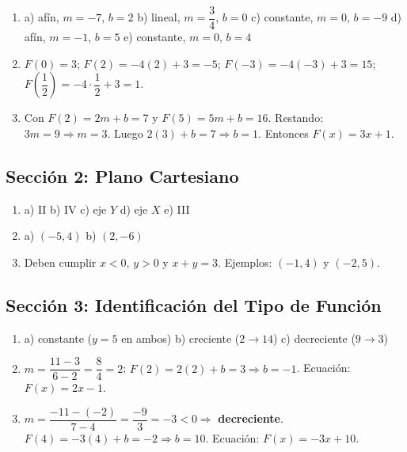 \documentclass[12pt, letterpaper]{article}
\begin{document}
  \begin{enumerate}[leftmargin=*, label=\textbf{\arabic*.}]
    \item a) afín, $m = -7$, $b = 2$ \quad b) lineal, $m = \dfrac{3}{4}$, $b = 0$ \quad c) constante, $m = 0$, $b = -9$ \quad d) afín, $m = -1$, $b = 5$ \quad e) constante, $m = 0$, $b = 4$

    \item $F(0) = 3$; \quad $F(2) = -4(2) + 3 = -5$; \quad $F(-3) = -4(-3) + 3 = 15$; \quad $F\!\left(\dfrac{1}{2}\right) = -4 \cdot \dfrac{1}{2} + 3 = 1$.

    \item Con $F(2) = 2m + b = 7$ y $F(5) = 5m + b = 16$. Restando: $3m = 9 \Rightarrow m = 3$.
          Luego $2(3) + b = 7 \Rightarrow b = 1$. Entonces $F(x) = 3x + 1$.
  \end{enumerate}

  \newpage

  \subsection*{Sección 2: Plano Cartesiano}

  \begin{enumerate}[leftmargin=*, label=\textbf{\arabic*.}]
    \item a) II \quad b) IV \quad c) eje $Y$ \quad d) eje $X$ \quad e) III

    \item a) $(-5, 4)$ \quad b) $(2, -6)$

    \item Deben cumplir $x < 0$, $y > 0$ y $x + y = 3$. Ejemplos: $(-1, 4)$ y $(-2, 5)$.
  \end{enumerate}

  \newpage

  \subsection*{Sección 3: Identificación del Tipo de Función}

  \begin{enumerate}[leftmargin=*, label=\textbf{\arabic*.}]
    \item a) constante ($y = 5$ en ambos) \quad b) creciente ($2 \to 14$) \quad c) decreciente ($9 \to 3$)

    \item $m = \dfrac{11 - 3}{6 - 2} = \dfrac{8}{4} = 2$; \quad $F(2) = 2(2) + b = 3 \Rightarrow b = -1$. \quad Ecuación: $F(x) = 2x - 1$.

    \item $m = \dfrac{-11 - (-2)}{7 - 4} = \dfrac{-9}{3} = -3 < 0 \Rightarrow$ \textbf{decreciente}.
          $F(4) = -3(4) + b = -2 \Rightarrow b = 10$. \quad Ecuación: $F(x) = -3x + 10$.
  \end{enumerate}
\end{document}
